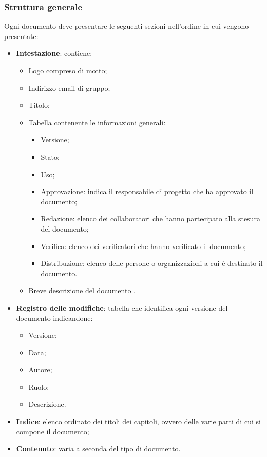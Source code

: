 \subsubsection{Struttura generale}
Ogni documento deve presentare le seguenti sezioni nell'ordine in cui vengono presentate:
\begin{itemize} 
    \item \textbf{Intestazione}:
    contiene:
    \begin{itemize} 
        \item Logo compreso di motto;
        \item Indirizzo email di gruppo; 
        \item Titolo;
        \item Tabella contenente le informazioni generali:
        \begin{itemize}
            \item Versione;
            \item Stato;
            \item Uso;
            \item Approvazione: indica il responsabile di progetto che ha approvato il documento; 
            \item Redazione: elenco dei collaboratori che hanno partecipato alla stesura del documento;
            \item Verifica: elenco dei verificatori che hanno verificato il documento;
            \item Distribuzione: elenco delle persone o organizzazioni a cui è destinato il documento.
        \end{itemize}
        \item Breve descrizione del documento .
    \end{itemize}
    \item \textbf{Registro delle modifiche}:
    tabella che identifica ogni versione del documento indicandone:
    \begin{itemize} 
        \item Versione;
        \item Data;
        \item Autore;
        \item Ruolo;
        \item Descrizione.
    \end{itemize}
    \item \textbf{Indice}:
    elenco ordinato dei titoli dei capitoli, ovvero delle varie parti di cui si compone il documento;
    \item \textbf{Contenuto}:
    varia a seconda del tipo di documento.
\end{itemize}

